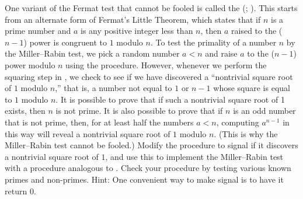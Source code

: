 \begin{exercise}
	\label{Exercise 1.28}
	One variant of the Fermat test that cannot be fooled is called the  (; ).
	This starts from an alternate form of Fermat’s Little Theorem, which states that if \( n \) is a prime number and \( a \) is any positive integer less than \( n \), then \( a \) raised to the (\( n - 1 \)) power is congruent to \( 1 \) modulo \( n \).
	To test the primality of a number \( n \) by the Miller--Rabin test, we pick a random number \( a < n \) and raise \( a \) to the (\( n - 1 \)) power modulo \( n \) using the  procedure.
	However, whenever we perform the squaring step in , we check to see if we have discovered a “nontrivial square root of \( 1 \) modulo \( n \),” that is, a number not equal to \( 1 \) or \( n - 1 \) whose square is equal to \( 1 \) modulo \( n \).
	It is possible to prove that if such a nontrivial square root of 1 exists, then \( n \) is not prime.
	It is also possible to prove that if \( n \) is an odd number that is not prime, then, for at least half the numbers \( a < n \), computing \( a^{n - 1} \) in this way will reveal a nontrivial square root of \( 1 \) modulo \( n \).
	(This is why the Miller--Rabin test cannot be fooled.)
	Modify the  procedure to signal if it discovers a nontrivial square root of \( 1 \), and use this to implement the Miller--Rabin test with a procedure analogous to .
	Check your procedure by testing various known primes and non-primes.
	Hint:
	One convenient way to make  signal is to have it return \( 0 \).
\end{exercise}
